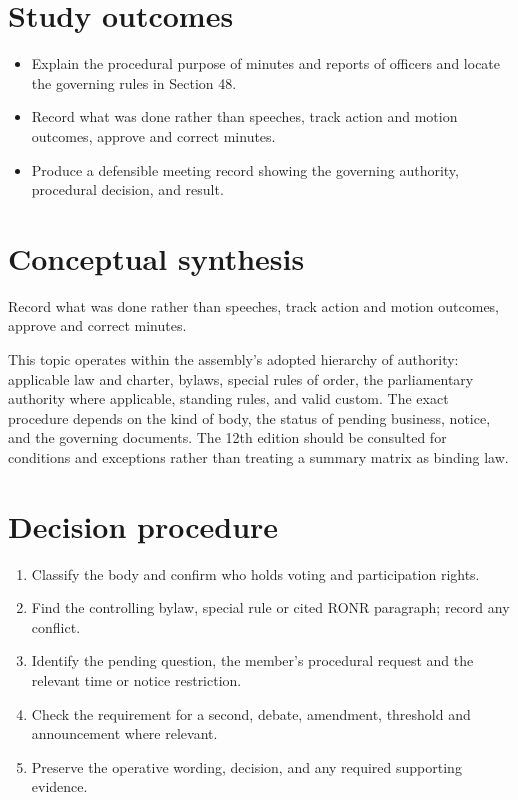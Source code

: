 \documentclass[11pt]{article}
\begin{document}
\SuiteOpen
{}
\section{Study outcomes}
\begin{itemize}[leftmargin=*,itemsep=4pt]
\item Explain the procedural purpose of minutes and reports of officers and locate the governing rules in Section 48.
\item Record what was done rather than speeches, track action and motion outcomes, approve and correct minutes.
\item Produce a defensible meeting record showing the governing authority, procedural decision, and result.
\end{itemize}

\section{Conceptual synthesis}
Record what was done rather than speeches, track action and motion outcomes, approve and correct minutes.

This topic operates within the assembly’s adopted hierarchy of authority: applicable law and charter, bylaws, special rules of order, the parliamentary authority where applicable, standing rules, and valid custom. The exact procedure depends on the kind of body, the status of pending business, notice, and the governing documents. The 12th edition should be consulted for conditions and exceptions rather than treating a summary matrix as binding law.
\section{Decision procedure}
\begin{enumerate}[leftmargin=*,itemsep=4pt]
\item Classify the body and confirm who holds voting and participation rights.
\item Find the controlling bylaw, special rule or cited RONR paragraph; record any conflict.
\item Identify the pending question, the member’s procedural request and the relevant time or notice restriction.
\item Check the requirement for a second, debate, amendment, threshold and announcement where relevant.
\item Preserve the operative wording, decision, and any required supporting evidence.
\end{enumerate}
\end{document}
